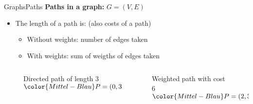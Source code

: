 
\begin{frame}{Graphs}{Paths}
  \textbf{Paths in a graph:}
  {\color{Mittel-Blau}$G = (V , E)$}
  \begin{itemize}
    \item<2->
      The {\color{Mittel-Blau}length of a path} is:
      (also costs of a path)
      \begin{itemize}
        \item<3->
          Without weights:
          {\color{Mittel-Blau}number of edges} taken
        \item<4->
          With weights:
          {\color{Mittel-Blau}sum of weigths of edges} taken
      \end{itemize}
  \end{itemize}
  \begin{columns}
    \begin{column}[b]{0.5\linewidth}
      \begin{figure}
        \begin{adjustbox}{width=0.95\linewidth}
          
        \end{adjustbox}
        \caption{{\color{Mittel-Blau}Directed path} of length 3 \newline
          ${\color{Mittel-Blau}P} = (0, 3, 1, 4)$}
        \label{fig:graphs:directed_path_length}
      \end{figure}
    \end{column}
    \begin{column}[b]{0.5\linewidth}
      \begin{figure}
        \begin{adjustbox}{width=0.8\linewidth}
          
        \end{adjustbox}
        \caption{{\color{Mittel-Blau}Weighted path} with cost 6 \newline
          ${\color{Mittel-Blau}P} = (2, 3, 1)$}
        \label{fig:graphs:weighted_path_length}
      \end{figure}
    \end{column}
  \end{columns}
\end{frame}


